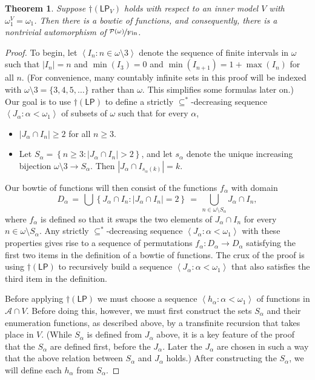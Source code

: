 \documentclass[11pt,leqno]{amsart}
\newtheorem{theorem}{Theorem}[section]
\theoremstyle{definition}
\theoremstyle{remark}
\newcommand{\A}{\mathcal{A}}
\newcommand{\explicitSet}[1]{\left\lbrace #1 \right\rbrace}
\newcommand{\brackets}[1]{\left\langle #1 \right\rangle}
\newcommand{\set}[2]{\explicitSet{#1 \colon #2}}
\newcommand{\seq}[2]{\brackets{#1 \colon #2}}
\newcommand{\<}{\langle}
\renewcommand{\>}{\rangle}
\renewcommand{\a}{\alpha}
\newcommand{\w}{\omega}
\newcommand{\0}{\emptyset}
\newcommand{\sub}{\subseteq}
\newcommand{\card}[1]{\left\lvert #1 \right\rvert}
\newcommand{\1}{1\hspace{-1.75mm}1}
\newcommand{\pwmf}{\nicefrac{\mathcal{P}(\w)}{\mathrm{Fin}}}
\newcommand{\cLP}{\dagger(\mathsf{LP})}
\begin{document}
\begin{theorem}\label{thm:main}
Suppose $\dagger(\mathsf{LP}_V)$ holds with respect to an inner model $V$ with $\w_1^V = \w_1$.  
Then there is a bowtie of functions, and consequently, there is a nontrivial automorphism of $\pwmf$. 
\end{theorem}
\begin{proof}
To begin, let $\seq{I_n}{n \in \w \setminus 3}$ denote the sequence of finite intervals in $\w$ such that 
$|I_n| = n$ and $\min(I_3) = 0$ and $\min(I_{n+1}) = 1 + \max(I_n)$ for all $n$. 
(For convenience, many countably infinite sets in this proof will be indexed with $\w \setminus 3 = \{3,4,5,\dots\}$ rather than $\w$. This simplifies some formulas later on.) 
Our goal is to use $\cLP$ to define a strictly $\sub^*$-decreasing sequence $\seq{J_\a}{\a < \w_1}$ of subsets of $\w$ such that for every $\a$, 
\begin{itemize}
\item[$\circ$] $\card{J_\a \cap I_n} \geq 2$ for all $n \geq 3$.
\item[$\circ$] Let $S_\a = \set{n \geq 3}{\card{J_\a \cap I_n} > 2}$, and let $s_\a$ denote the unique increasing bijection $\w \setminus 3 \to S_\a$. Then $\card{J_\a \cap I_{s_\a(k)}} = k$.
\end{itemize}
Our bowtie of functions will then consist of the functions 
$f_\a$ 
with domain 
$$D_\a \,=\, \textstyle \bigcup \set{J_\a \cap I_n}{\card{J_\a \cap I_n} = 2} \,=\, \bigcup_{n \in \w \setminus S_\a}J_\a \cap I_n,$$
where $f_\a$ is defined so that it swaps the two elements of $J_\a \cap I_n$ for every $n \in \w \setminus S_\a$. 
Any strictly $\sub^*$-decreasing sequence $\seq{J_\a}{\a < \w_1}$ with these properties gives rise to a sequence of permutations $f_\a: D_\a \to D_\a$ satisfying the first two items in the definition of a bowtie of functions. 
The crux of the proof is using $\cLP$ to recursively build a sequence $\seq{J_\a}{\a < \w_1}$ that also satisfies the third item in the definition. 

Before applying $\cLP$ we must choose a sequence $\seq{h_\a}{\a < \w_1}$ of functions in $\A \cap V$. 
Before doing this, however, we must first construct the sets $S_\a$ and their enumeration functions, as described above, by a transfinite recursion that takes place in $V$. 
(While $S_\a$ is defined from $J_\a$ above, it is a key feature of the proof that the $S_\a$ are defined first, before the $J_\a$. Later the $J_\a$ are chosen in such a way that the above relation between $S_\a$ and $J_\a$ holds.) 
After constructing the $S_\a$, we will define each $h_\a$ from $S_\a$. 


\end{proof}
\end{document}
